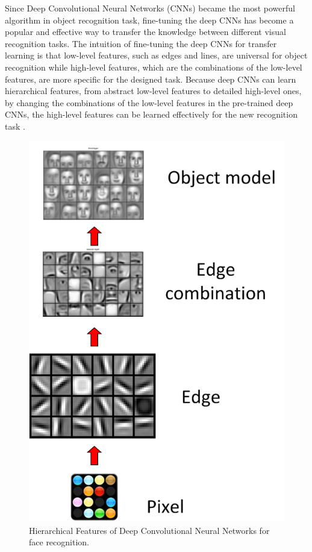 Since Deep Convolutional Neural Networks (CNNs) became the most powerful algorithm in object recognition task, fine-tuning the deep CNNs has become a popular and effective way to transfer the knowledge between different visual recognition tasks. The intuition of fine-tuning the deep CNNs for transfer learning is that low-level features, such as edges and lines, are universal for object recognition while high-level features, which are the combinations of the low-level features, are more specific for the designed task. Because deep CNNs can learn hierarchical features, from abstract low-level features to detailed high-level ones, by changing the combinations of the low-level features in the pre-trained deep CNNs, the high-level features can be learned effectively for the new recognition task \cite{farabet2013learning}.

\begin{figure}
	\centering
	\includegraphics[scale=.7]{relatedwork/fig/hierachy}
	\caption{Hierarchical Features of Deep Convolutional Neural Networks for face recognition.}
\end{figure}

